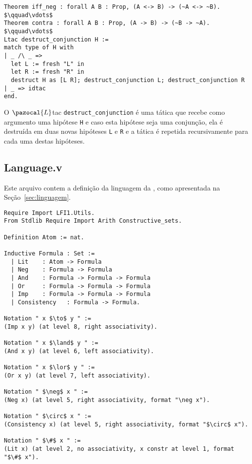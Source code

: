       \begin{lstlisting}[name=Utils, frame=single, language=coq]
Theorem iff_neg : forall A B : Prop, (A <-> B) -> (~A <-> ~B).
$\qquad\vdots$
Theorem contra : forall A B : Prop, (A -> B) -> (~B -> ~A).
$\qquad\vdots$
Ltac destruct_conjunction H :=
match type of H with
| _ /\ _ => 
  let L := fresh "L" in
  let R := fresh "R" in
  destruct H as [L R]; destruct_conjunction L; destruct_conjunction R
| _ => idtac
end.
      \end{lstlisting}

      O $\pazocal{L}$tac  \texttt{destruct\_conjunction} é uma tática que recebe como argumento uma hipótese \texttt{H} e caso esta hipótese seja uma conjunção, ela é destruída em duas novas hipóteses \texttt{L} e \texttt{R} e a tática é repetida recursivamente para cada uma destas hipóteses.

      \subsection{Language.v}\label{sec:language}

      Este arquivo contem a definição da linguagem da \lfium{}, como apresentada na Seção~\ref{sec:linguagem}.

      \begin{lstlisting}[name=Language, frame=single, language=coq]
Require Import LFI1.Utils.
From Stdlib Require Import Arith Constructive_sets.

Definition Atom := nat.

Inductive Formula : Set :=
  | Lit    : Atom -> Formula
  | Neg    : Formula -> Formula
  | And    : Formula -> Formula -> Formula
  | Or     : Formula -> Formula -> Formula
  | Imp    : Formula -> Formula -> Formula
  | Consistency   : Formula -> Formula.

Notation " x $\to$ y " := 
(Imp x y) (at level 8, right associativity).

Notation " x $\land$ y " := 
(And x y) (at level 6, left associativity).

Notation " x $\lor$ y " := 
(Or x y) (at level 7, left associativity).

Notation " $\neg$ x " := 
(Neg x) (at level 5, right associativity, format "\neg x").

Notation " $\circ$ x " := 
(Consistency x) (at level 5, right associativity, format "$\circ$ x").

Notation " $\#$ x " :=
(Lit x) (at level 2, no associativity, x constr at level 1, format "$\#$ x").
      \end{lstlisting}
      
